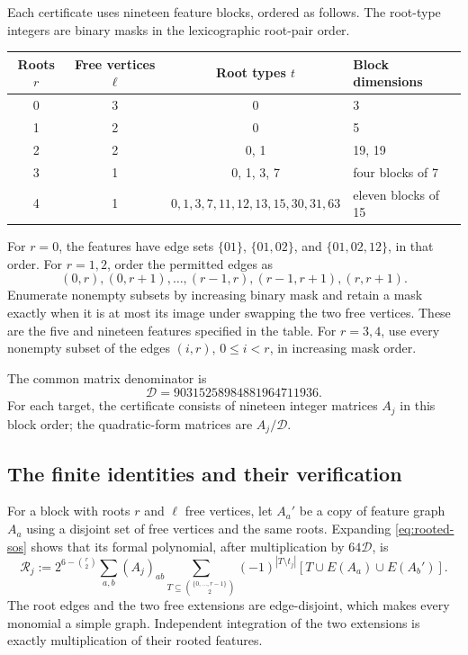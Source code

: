 \documentclass[11pt,a4paper]{article}
\theoremstyle{remark}
\numberwithin{equation}{section}
\begin{document}
Each certificate uses nineteen feature blocks, ordered as follows.
The root-type integers are binary masks in the lexicographic
root-pair order.
\begin{center}
\begin{tabular}{@{}cccl@{}}
\toprule
Roots $r$ & Free vertices $\ell$ & Root types $t$ & Block dimensions\\
\midrule
0 & 3 & 0 & 3\\
1 & 2 & 0 & 5\\
2 & 2 & 0, 1 & 19, 19\\
3 & 1 & 0, 1, 3, 7 & four blocks of 7\\
4 & 1 & $0,1,3,7,11,12,13,15,30,31,63$ & eleven blocks of 15\\
\bottomrule
\end{tabular}
\end{center}
For $r=0$, the features have edge sets $\{01\}$,
$\{01,02\}$, and $\{01,02,12\}$, in that order.
For $r=1,2$, order the permitted edges as
\[
 (0,r),(0,r+1),\ldots,(r-1,r),(r-1,r+1),(r,r+1).
\]
Enumerate nonempty subsets by increasing binary mask and retain
a mask exactly when it is at most its image under swapping the
two free vertices. These are the five and nineteen features
specified in the table. For $r=3,4$, use every nonempty subset
of the edges $(i,r)$, $0\leq i<r$, in increasing mask order.

The common matrix denominator is
\[
 \mathscr D=90315258984881964711936.
\]
For each target, the certificate consists of nineteen integer
matrices $A_j$ in this block order; the quadratic-form matrices
are $A_j/\mathscr D$.

\subsection{The finite identities and their verification}

For a block with roots $r$ and $\ell$ free vertices, let
$A_a'$ be a copy of feature graph $A_a$ using a disjoint set of
free vertices and the same roots. Expanding \eqref{eq:rooted-sos}
shows that its formal polynomial, after multiplication by
$64\mathscr D$, is
\begin{equation}\label{eq:block-expansion}
 \mathcal R_j:=2^{6-\binom r2}\sum_{a,b}(A_j)_{ab}
 \sum_{T\subseteq\binom{\{0,\ldots,r-1\}}2}
    (-1)^{|T\setminus t_j|}
       [T\cup E(A_a)\cup E(A_b')].
\end{equation}
The root edges and the two free extensions are edge-disjoint,
which makes every monomial a simple graph. Independent integration
of the two extensions is exactly multiplication of their rooted
features.
\end{document}
